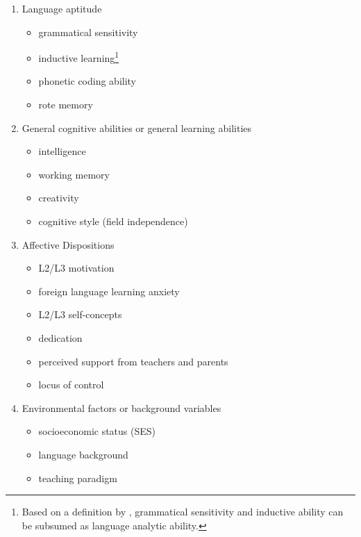 \documentclass[output=paper]{langsci/langscibook}
\begin{document}
\begin{enumerate}
\item Language aptitude 

\begin{itemize}
\item grammatical sensitivity
\item inductive learning\footnote{Based on a definition by \citet{Skehan1998}, grammatical sensitivity and inductive ability can be subsumed as language analytic ability.}
\item phonetic coding ability
\item rote memory
\end{itemize}

\item General cognitive abilities or general learning abilities
\begin{itemize}
\item intelligence
\item working memory
\item creativity
\item cognitive style (field independence)
\end{itemize}

\item Affective Dispositions

\begin{itemize}
\item L2/L3 motivation
\item foreign language learning anxiety
\item L2/L3 self-concepts
\item dedication
\item perceived support from teachers and parents
\item locus of control
\end{itemize}

\item Environmental factors or background variables

\begin{itemize}
\item socioeconomic status (SES)
\item language background
\item teaching paradigm 
\end{itemize}
\end{enumerate}
\end{document}
